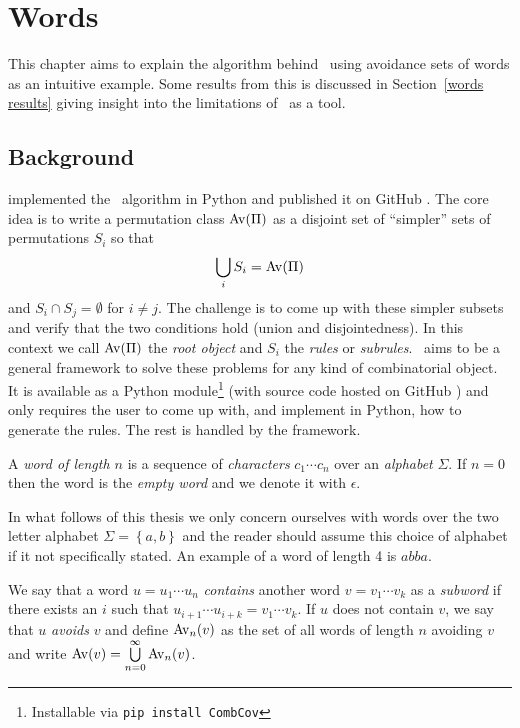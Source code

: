 \chapter{Words\label{words chapter}}

This chapter aims to explain the algorithm behind \CombCov\ using avoidance sets
of words as an intuitive example. Some results from this is discussed in 
Section~\ref{words results} giving insight into the limitations of \CombCov\ as 
a tool.

\section{Background\label{words background}}

\textcite{bean_automatic_2019} implemented the \Struct\ algorithm in Python and 
published it on GitHub \cite{bean_permstruct_2017}. The core idea is to write a 
permutation class ${\mathrm{Av}\!\left(\Pi\right)}$ as a disjoint set of ``simpler'' sets of 
permutations $S_i$ so that \[\bigcup_i S_i = {\mathrm{Av}\!\left(\Pi\right)}\] and $S_i \cap S_j = 
\emptyset$ for $i \neq j$. The challenge is to come up with these simpler 
subsets and verify that the two conditions hold (union and disjointedness). In 
this context we call ${\mathrm{Av}\!\left(\Pi\right)}$ the \emph{root object} and $S_i$ the 
\emph{rules} or \emph{subrules}. \CombCov\ aims to be a general framework to 
solve these problems for any kind of combinatorial object. It is available as a 
Python module\footnote{Installable via \texttt{pip install CombCov}} (with 
source code hosted on GitHub \cite{kristinsson_combcov:_2019}) and only requires 
the user to come up with, and implement in Python, how to generate the rules. 
The rest is handled by the framework.

\begin{definition}
  A \emph{word of length $n$} is a sequence of \emph{characters} $c_1 \cdots 
  c_n$ over an \emph{alphabet} $\Sigma$. If $n = 0$ then the word is the 
  \emph{empty word} and we denote it with $\epsilon$.
\end{definition}

In what follows of this thesis we only concern ourselves with words over the two 
letter alphabet $\Sigma = \left\{ a,b \right\}$ and the reader should assume 
this choice of alphabet if it not specifically stated. An example of a word of 
length 4 is $abba$.

\begin{definition}
  We say that a word $u = u_1 \cdots u_n$ \emph{contains} another word $v = v_1 
  \cdots v_k$ as a \emph{subword} if there exists an $i$ such that $u_{i+1} 
  \cdots u_{i+k} = v_1 \cdots v_k$. If $u$ does not contain $v$, we say that $u$ 
  \emph{avoids} $v$ and define ${\mathrm{Av}_n\!\left(v\right)}$ as the set of all words of length $n$ 
  avoiding $v$ and write ${\mathrm{Av}\!\left(v\right)} = \bigcup\limits_{n=0}^{\infty}{\mathrm{Av}_n\!\left(v\right)}$.
\end{definition}

